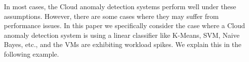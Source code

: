 
In most cases, the Cloud anomaly detection systems perform well under these assumptions. However, there are some cases where they may suffer from performance issues. In this paper we specifically consider the case where a Cloud anomaly detection system is using a linear classifier like K-Means, SVM, Naive Bayes, etc., and the VMs are exhibiting workload spikes. We explain this in the following example.

